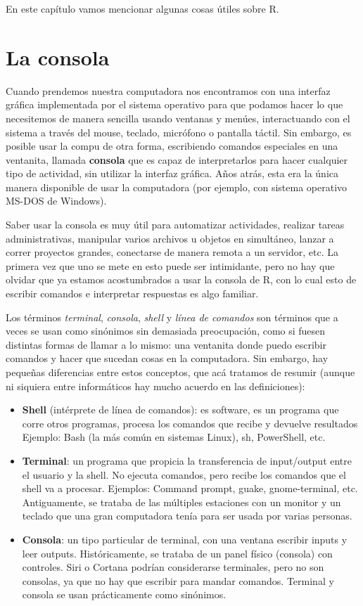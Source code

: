 \documentclass[
]{book}
\providecommand{\tightlist}{%
  \setlength{\itemsep}{0pt}\setlength{\parskip}{0pt}}
\begin{document}
En este capítulo vamos mencionar algunas cosas útiles sobre R.

\hypertarget{la-consola}{%
\section{La consola}\label{la-consola}}

Cuando prendemos nuestra computadora nos encontramos con una interfaz gráfica implementada por el sistema operativo para que podamos hacer lo que necesitemos de manera sencilla usando ventanas y menúes, interactuando con el sistema a través del mouse, teclado, micrófono o pantalla táctil. Sin embargo, es posible usar la compu de otra forma, escribiendo comandos especiales en una ventanita, llamada \textbf{consola} que es capaz de interpretarlos para hacer cualquier tipo de actividad, sin utilizar la interfaz gráfica. Años atrás, esta era la única manera disponible de usar la computadora (por ejemplo, con sistema operativo MS-DOS de Windows).

Saber usar la consola es muy útil para automatizar actividades, realizar tareas administrativas, manipular varios archivos u objetos en simultáneo, lanzar a correr proyectos grandes, conectarse de manera remota a un servidor, etc. La primera vez que uno se mete en esto puede ser intimidante, pero no hay que olvidar que ya estamos acostumbrados a usar la consola de R, con lo cual esto de escribir comandos e interpretar respuestas es algo familiar.

Los términos \emph{terminal}, \emph{consola}, \emph{shell} y \emph{línea de comandos} son términos que a veces se usan como sinónimos sin demasiada preocupación, como si fuesen distintas formas de llamar a lo mismo: una ventanita donde puedo escribir comandos y hacer que sucedan cosas en la computadora. Sin embargo, hay pequeñas diferencias entre estos conceptos, que acá tratamos de resumir (aunque ni siquiera entre informáticos hay mucho acuerdo en las definiciones):

\begin{itemize}
\tightlist
\item
  \textbf{Shell} (intérprete de línea de comandos): es software, es un programa que corre otros programas, procesa los comandos que recibe y devuelve resultados Ejemplo: Bash (la más común en sistemas Linux), sh, PowerShell, etc.
\item
  \textbf{Terminal}: un programa que propicia la transferencia de input/output entre el usuario y la shell. No ejecuta comandos, pero recibe los comandos que el shell va a procesar. Ejemplos: Command prompt, guake, gnome-terminal, etc. Antiguamente, se trataba de las múltiples estaciones con un monitor y un teclado que una gran computadora tenía para ser usada por varias personas.
\item
  \textbf{Consola}: un tipo particular de terminal, con una ventana escribir inputs y leer outputs. Históricamente, se trataba de un panel físico (consola) con controles. Siri o Cortana podrían considerarse terminales, pero no son consolas, ya que no hay que escribir para mandar comandos. Terminal y consola se usan prácticamente como sinónimos.
\end{itemize}
\end{document}
